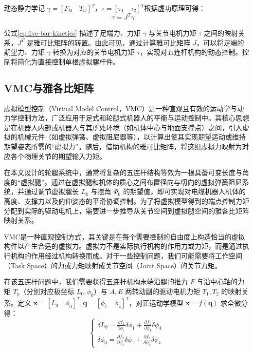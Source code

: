 \documentclass[
  oneside,
  degree=bachelor,
  fullwidthstop=false,
  fontset=fandol,
  times=false,
  minted=true,
  biblatex=true,
]{tongjithesis}
\begin{document}
动态静力学记 $\gamma = [F_{bl} \quad T_{bl}]^T$，$\tau = [\tau_1 \quad \tau_2]^T$根据虚功原理可得：
\begin{equation}
    \tau = J^T \gamma \quad
    \label{eq:five-bar-kinetics}
\end{equation}

公式\ref{eq:five-bar-kinetics} 描述了足端力、力矩 $\gamma$ 与关节电机力矩 $\tau$ 之间的映射关系，$J^T$ 是雅可比矩阵的转置。由此可见，通过计算雅可比矩阵 $J$，可以将足端的期望力、力矩 $\gamma$ 转换为对应的关节电机力矩 $\tau$，实现对五连杆机构的动态控制。控制将简化为直接控制单根虚拟腿杆件。

\subsection{VMC与雅各比矩阵}
虚拟模型控制（Virtual Model Control，VMC）是一种直观且有效的运动学与动力学控制方法，广泛应用于足式和轮腿式机器人的平衡与运动控制中。其核心思想是在机器人内部或机器人与其所处环境（如机体中心与地面支撑点）之间，引入虚拟的机械元件（如虚拟弹簧、虚拟阻尼器等），以计算出使其实现期望运动或维持期望姿态所需的“虚拟力”。随后，借助机构的雅可比矩阵，将这组虚拟力映射为对应各个物理关节的期望输入力矩。

在本文设计的轮腿系统中，通常将复杂的五连杆结构等效为一根具备可变长度与角度的“虚拟腿”。通过在虚拟腿和机体的质心之间布置径向与切向的虚拟弹簧阻尼系统，并通过调节虚拟腿长 $L_0$ 与摆角 $\varPhi_0$ 的期望值，即可实现对电缆机器人机体的高度、支撑力以及俯仰姿态的平滑协调控制。为了将虚拟模型得到的端点控制力矩分配到实际的驱动电机上，需要进一步推导从关节空间到虚拟腿空间的雅各比矩阵映射关系。

VMC是一种直观控制方式，其关键是在每个需要控制的自由度上构造恰当的虚拟构件以产生合适的虚拟力。虚拟力不是实际执行机构的作用力或力矩，而是通过执行机构的作用经过机构转换而成。对于一些控制问题，我们可能需要将工作空间（Task Space）的力或力矩映射成关节空间（Joint Space）的关节力矩。

在该五连杆问题中，我们需要获得五连杆机构末端沿腿的推力 $F$ 与沿中心轴的力矩 $T_p$（分别对应极坐标 $L_0, \phi_0$）与 $A, E$ 两转动副的驱动电机力矩 $T_1, T_2$ 的映射关系。定义 $\boldsymbol{x} = [L_0 \quad \phi_0]^T, \boldsymbol{q} = [\phi_1 \quad \phi_4]^T$，对正运动学模型 $\boldsymbol{x} = f(\boldsymbol{q})$ 求全微分得：
\begin{equation}
    \begin{cases}
        \delta L_0 = \frac{\partial f_1}{\partial \phi_1} \delta \phi_1 + \frac{\partial f_1}{\partial \phi_4} \delta \phi_4 \\
        \delta \phi_0 = \frac{\partial f_2}{\partial \phi_1} \delta \phi_1 + \frac{\partial f_2}{\partial \phi_4} \delta \phi_4
    \end{cases}
    \label{eq:differential}
\end{equation}
\end{document}
